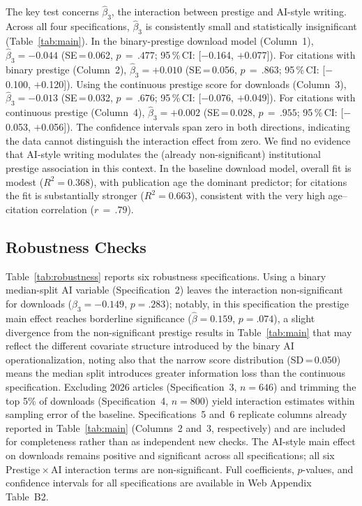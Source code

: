 \documentclass[12pt,a4paper]{article}
\begin{document}
The key test concerns $\hat{\beta}_3$, the interaction between prestige
and AI-style writing.
Across all four specifications, $\hat{\beta}_3$ is consistently small
and statistically insignificant (Table~\ref{tab:main}).
In the binary-prestige download model (Column~1),
$\hat{\beta}_3 = -0.044$ (SE\,=\,0.062, $p\,=\,.477$;
95\,\%\,CI: [$-$0.164, $+$0.077]).
For citations with binary prestige (Column~2),
$\hat{\beta}_3 = +0.010$ (SE\,=\,0.056, $p\,=\,.863$;
95\,\%\,CI: [$-$0.100, $+$0.120]).
Using the continuous prestige score for downloads (Column~3),
$\hat{\beta}_3 = -0.013$ (SE\,=\,0.032, $p\,=\,.676$;
95\,\%\,CI: [$-$0.076, $+$0.049]).
For citations with continuous prestige (Column~4),
$\hat{\beta}_3 = +0.002$ (SE\,=\,0.028, $p\,=\,.955$;
95\,\%\,CI: [$-$0.053, $+$0.056]).
The confidence intervals span zero in both directions,
indicating the data cannot distinguish the interaction effect from zero.
We find no evidence that AI-style writing modulates the (already
non-significant) institutional prestige association in this context.
In the baseline download model, overall fit is modest ($R^2 = 0.368$),
with publication age the dominant predictor; for citations the fit is
substantially stronger ($R^2 = 0.663$), consistent with the very high
age--citation correlation ($r\,=\,.79$).

\subsection{Robustness Checks}

Table~\ref{tab:robustness} reports six robustness specifications.
Using a binary median-split AI variable (Specification~2) leaves
the interaction non-significant for downloads
($\hat{\beta}_3 = -0.149$, $p=.283$); notably, in this specification
the prestige main effect reaches borderline significance
($\hat{\beta} = 0.159$, $p=.074$), a slight divergence from the
non-significant prestige results in Table~\ref{tab:main} that may
reflect the different covariate structure introduced by the binary AI
operationalization, noting also that the narrow score distribution
(SD\,=\,0.050) means the median split introduces greater information loss
than the continuous specification.
Excluding 2026 articles (Specification~3, $n = 646$) and trimming the
top 5\% of downloads (Specification~4, $n = 800$) yield interaction
estimates within sampling error of the baseline.
Specifications~5 and~6 replicate columns already reported in
Table~\ref{tab:main} (Columns~2 and~3, respectively) and are included
for completeness rather than as independent new checks.
The AI-style main effect on downloads remains positive and significant
across all specifications; all six Prestige\,$\times$\,AI interaction
terms are non-significant.
Full coefficients, $p$-values, and confidence intervals for all
specifications are available in Web Appendix Table~B2.
\end{document}
